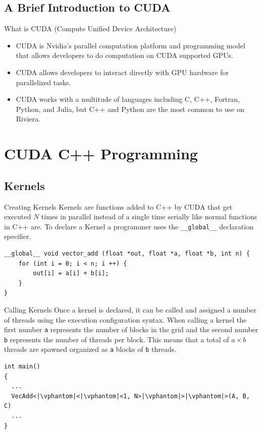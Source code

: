 \documentclass[aspectratio=169]{beamer}
\begin{document}
\subsection{A Brief Introduction to CUDA}

\begin{frame}{What is CUDA (Compute Unified Device Architecture)}
	\begin{itemize}
		\item CUDA is Nvidia's parallel computation platform and programming model that allows developers to do computation on CUDA supported GPUs.
		\item CUDA allows developers to interact directly with GPU hardware for parallelized tasks.
		\item CUDA works with a multitude of languages including C, C++, Fortran, Python, and Julia, but C++ and Python are the most common to use on Riviera.
	\end{itemize}
\end{frame}

\section{CUDA C++ Programming}
\subsection{Kernels}
\begin{frame}[fragile]{Creating Kernels}
	Kernels are functions added to C++ by CUDA that get executed \(N\) times in parallel instead of a single time serially like normal functions in C++ are. To declare a Kernel a programmer uses the \texttt{__global__} declaration specifier.

	\begin{verbatim}
__global__ void vector_add (float *out, float *a, float *b, int n) {
    for (int i = 0; i < n; i ++) {
        out[i] = a[i] + b[i];
    }
}
    \end{verbatim}

\end{frame}

\begin{frame}[fragile]{Calling Kernels}
	Once a kernel is declared, it can be called and assigned a number of threads using the  execution configuration syntax. When calling a kernel the first number \texttt{a} represents the number of blocks in the grid and the second number \texttt{b} represents the number of threads per block. This means that a total of \(a \times b\) threads are spawned organized as \texttt{a} blocks of \texttt{b} threads.

	\begin{verbatim}
int main()
{
  ...
  VecAdd<|\vphantom|<|\vphantom|<1, N>|\vphantom|>|\vphantom|>(A, B, C)
  ...
}
  \end{verbatim}
\end{frame}
\end{document}
